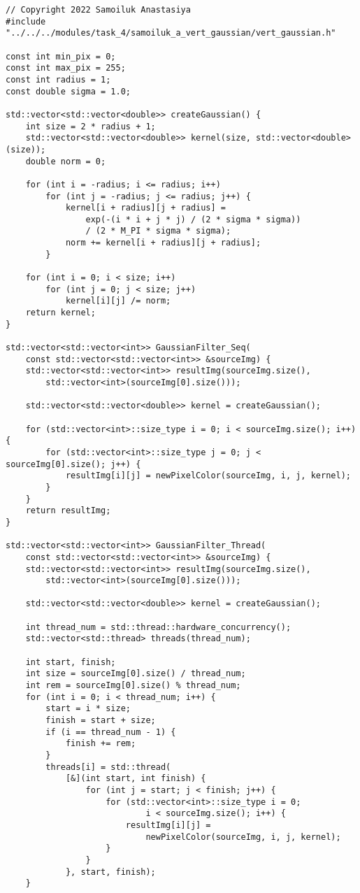 \documentclass{report}
\begin{document}
\begin{lstlisting}
// Copyright 2022 Samoiluk Anastasiya
#include "../../../modules/task_4/samoiluk_a_vert_gaussian/vert_gaussian.h"

const int min_pix = 0;
const int max_pix = 255;
const int radius = 1;
const double sigma = 1.0;

std::vector<std::vector<double>> createGaussian() {
    int size = 2 * radius + 1;
    std::vector<std::vector<double>> kernel(size, std::vector<double>(size));
    double norm = 0;

    for (int i = -radius; i <= radius; i++)
        for (int j = -radius; j <= radius; j++) {
            kernel[i + radius][j + radius] =
                exp(-(i * i + j * j) / (2 * sigma * sigma))
                / (2 * M_PI * sigma * sigma);
            norm += kernel[i + radius][j + radius];
        }

    for (int i = 0; i < size; i++)
        for (int j = 0; j < size; j++)
            kernel[i][j] /= norm;
    return kernel;
}

std::vector<std::vector<int>> GaussianFilter_Seq(
    const std::vector<std::vector<int>> &sourceImg) {
    std::vector<std::vector<int>> resultImg(sourceImg.size(),
        std::vector<int>(sourceImg[0].size()));

    std::vector<std::vector<double>> kernel = createGaussian();

    for (std::vector<int>::size_type i = 0; i < sourceImg.size(); i++) {
        for (std::vector<int>::size_type j = 0; j < sourceImg[0].size(); j++) {
            resultImg[i][j] = newPixelColor(sourceImg, i, j, kernel);
        }
    }
    return resultImg;
}

std::vector<std::vector<int>> GaussianFilter_Thread(
    const std::vector<std::vector<int>> &sourceImg) {
    std::vector<std::vector<int>> resultImg(sourceImg.size(),
        std::vector<int>(sourceImg[0].size()));

    std::vector<std::vector<double>> kernel = createGaussian();

    int thread_num = std::thread::hardware_concurrency();
    std::vector<std::thread> threads(thread_num);

    int start, finish;
    int size = sourceImg[0].size() / thread_num;
    int rem = sourceImg[0].size() % thread_num;
    for (int i = 0; i < thread_num; i++) {
        start = i * size;
        finish = start + size;
        if (i == thread_num - 1) {
            finish += rem;
        }
        threads[i] = std::thread(
            [&](int start, int finish) {
                for (int j = start; j < finish; j++) {
                    for (std::vector<int>::size_type i = 0;
                            i < sourceImg.size(); i++) {
                        resultImg[i][j] =
                            newPixelColor(sourceImg, i, j, kernel);
                    }
                }
            }, start, finish);
    }


\end{lstlisting}
\end{document}
